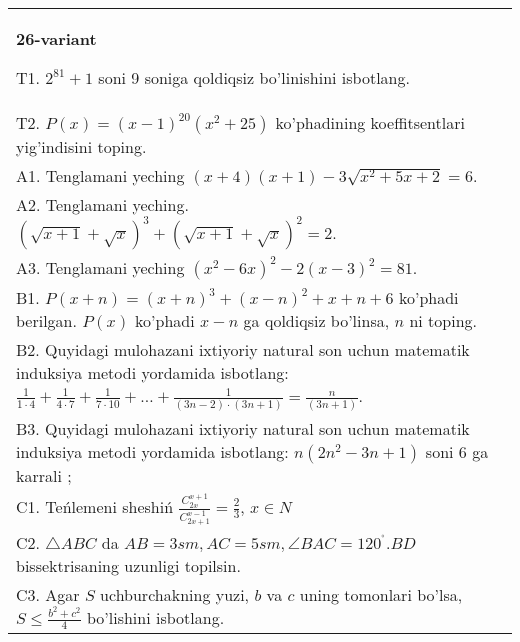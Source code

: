 \documentclass{article}
\begin{document}
\begin{tabular}{m{17cm}}
\textbf{26-variant}
\newline

T1. \(2^{81} + 1\) soni 9 soniga qoldiqsiz bo'linishini isbotlang. \\
T2. \(P(x) = (x - 1)^{20}\left( x^{2} + 25 \right)\) ko'phadining koeffitsentlari yig'indisini toping. \\
A1. Tenglamani yeching \((x + 4)(x + 1) - 3\sqrt{x^{2} + 5x + 2} = 6\). \\
A2. Tenglamani yeching. \((\sqrt{x + 1} + \sqrt{x})^{3} + (\sqrt{x + 1} + \sqrt{x})^{2} = 2\). \\
A3. Tenglamani yeching \(\left( x^{2} - 6x \right)^{2} - 2(x - 3)^{2} = 81\). \\
B1. \(P(x + n) = (x + n)^{3} + (x - n)^{2} + x + n + 6\) ko'phadi berilgan. \(P(x)\) ko'phadi \(x - n\) ga qoldiqsiz bo'linsa, \(n\) ni toping. \\
B2. Quyidagi mulohazani ixtiyoriy natural son uchun matematik induksiya metodi yordamida isbotlang: \(\frac{1}{1 \cdot 4} + \frac{1}{4 \cdot 7} + \frac{1}{7 \cdot 10} + \ldots + \frac{1}{(3n - 2) \cdot (3n + 1)} = \frac{n}{(3n + 1)}\). \\
B3. Quyidagi mulohazani ixtiyoriy natural son uchun matematik induksiya metodi yordamida isbotlang: \(n\left( 2n^{2} - 3n + 1 \right)\) soni 6 ga karrali ; \\
C1. Teńlemeni sheshiń \(\frac{C_{2x}^{x + 1}}{C_{2x + 1}^{x - 1}} = \frac{2}{3}\), \(x \in N\) \\
C2. \(\bigtriangleup ABC\) da \(AB = 3sm,AC = 5sm,\angle BAC = 120^{{^\circ}}.BD\) bissektrisaning uzunligi topilsin. \\
C3. Agar \(S\) uchburchakning yuzi, \(b\) va \(c\) uning tomonlari bo'lsa, \(S \leq \frac{b^{2} + c^{2}}{4}\) bo'lishini isbotlang. \\

\end{tabular}
\vspace{1cm}
\end{document}
